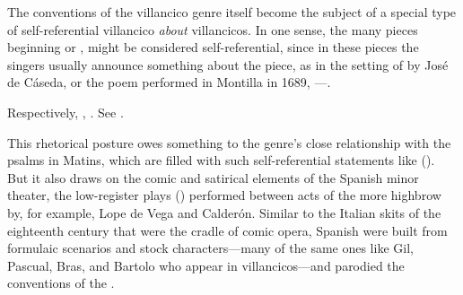The conventions of the villancico genre itself become the subject of a special
type of self-referential villancico \emph{about} villancicos.
In one sense, the many pieces beginning  or , might be considered self-referential, since in these pieces the
singers usually announce something about the piece, as in the setting of
 by José de Cáseda, or the poem performed in
Montilla in 1689, ---.%
\begin{Footnote}
    Respectively, , \autocite[116 (no signature
    listed)]{BNE:VCs17C}.
    See \autocite{LeGuin:Tonadilla}.
\end{Footnote}
This rhetorical posture owes something to the genre's close
relationship with the psalms in Matins, which are filled with such
self-referential statements like 
().
But it also draws on the comic and satirical elements of the Spanish minor
theater, the low-register plays () performed between acts of
the more highbrow  by, for example, Lope de Vega and Calderón.%
    \Autocite{Cotarelo:Entremeses}
Similar to the Italian  skits of the eighteenth
century that were the cradle of comic opera, Spanish  were
built from formulaic scenarios and stock characters---many of the same ones
like Gil, Pascual, Bras, and Bartolo who appear in villancicos---and parodied
the conventions of the .


